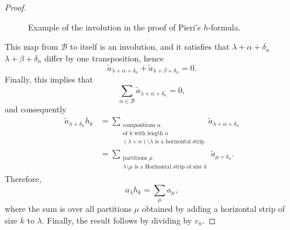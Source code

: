 \begin{proof}
\begin{figure}[htbp]
        \caption{Example of the involution in the proof of Pieri's \(h\)-formula.}
        \label{fig:pieri-h-formula-involution}
    \end{figure}
    
    This map from \(\mathcal{B}\) to itself is an involution,
    and it satisfies that
        \(\lambda + \alpha + \delta_n\)
        \(\lambda + \beta + \delta_n\)
    differ by one transposition,
    hence
    \begin{equation}
        \tilde{a}_{\lambda + \alpha + \delta_n} + \tilde{a}_{\lambda + \beta + \delta_n} = 0.
    \end{equation}
    Finally,
    this implies that
    \begin{equation}
        \sum_{\alpha \in \mathcal{B}}
        \tilde{a}_{\lambda + \alpha + \delta_n}
        = 0,
    \end{equation}
    and consequently
    \begin{align}
        \tilde{a}_{\lambda + \delta_n} h_k
        &= \sum_{\substack{\text{compositions } \alpha \\ \text{of } k \text{ with length } n \\ (\lambda + \alpha) \setminus \lambda \text{ is a horizontal strip}}}
        \tilde{a}_{\lambda + \alpha + \delta_n} \\
        &= \sum_{\substack{\text{partitions } \mu \\ \lambda \setminus \mu \text{ is a Horizontal strip of size } k}}
        \tilde{a}_{\mu + \delta_n}.
    \end{align}
    Therefore,
    \begin{equation}
        a_\lambda h_k = \sum_{\mu} a_{\mu},
    \end{equation}
    where the sum is over all partitions \(\mu\) obtained by adding a horizontal strip of size \(k\) to \(\lambda\).
    Finally, the result follows by dividing by \(v_n\).
\end{proof}

